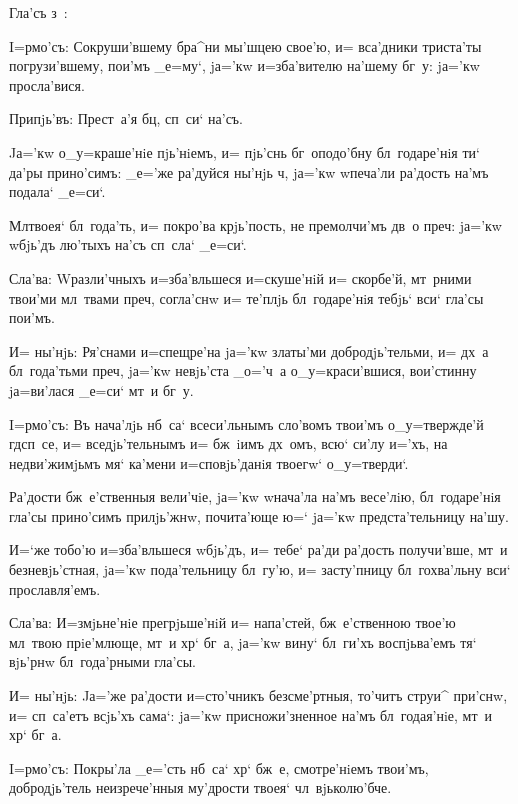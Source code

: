 Гла'съ з~:


I=рмо'съ: Сокруши'вшему бра^ни мы'шцею свое'ю, и= 
вса'дники триста'ты погрузи'вшему, пои'мъ _е=му`, jа='кw 
и=зба'вителю на'шему бг~у: jа='кw просла'вися.

Припjь'въ: Прест~а'я бц, сп~си` на'съ.

Jа='кw о_у=краше'нiе пjь'нiемъ, и= пjь'снь 
бг~оподо'бну бл~годаре'нiя ти` да'ры прино'симъ: _е='же 
ра'дуйся ны'нjь ч, jа='кw w\т печа'ли ра'дость на'мъ 
подала` _е=си`.

Мл твоея` бл~года'ть, и= покро'ва крjь'пость, не 
премолчи'мъ дв~о преч: jа='кw w\т бjь'дъ лю'тыхъ 
на'съ сп~сла` _е=си`.

Сла'ва: W\т разли'чныхъ и=зба'вльшеся и=скуше'нiй и= 
скорбе'й, мт~рними твои'ми мл~твами преч, согла'снw 
и= те'плjь бл~годаре'нiя тебjь` вси` гла'сы пои'мъ.

И= ны'нjь: Ря'снами и=спещре'на jа='кw златы'ми 
добродjь'тельми, и= дх~а бл~года'тьми преч, jа='кw 
невjь'ста _о='ч~а о_у=краси'вшися, вои'стинну jа=ви'лася 
_е=си` мт~и бг~у.


I=рмо'съ: Въ нача'лjь нб~са` всеси'льнымъ сло'вомъ 
твои'мъ о_у=твержде'й гд сп~се, и= вседjь'тельнымъ и= 
бж~iимъ дх~омъ, всю` си'лу и='хъ, на недви'жимjьмъ мя` 
ка'мени и=сповjь'данiя твоегw` о_у=тверди`.

Ра'дости бж~е'ственныя вели'чiе, jа='кw w\т нача'ла 
на'мъ весе'лiю, бл~годаре'нiя гла'сы прино'симъ 
прилjь'жнw, почита'юще ю=` jа='кw предста'тельницу на'шу.

И=`же тобо'ю и=зба'вльшеся w\т бjь'дъ, и= тебе` ра'ди 
ра'дость получи'вше, мт~и безневjь'стная, jа='кw 
пода'тельницу бл~гу'ю, и= засту'пницу бл~гохва'льну вси` 
прославля'емъ.

Сла'ва: И=змjьне'нiе прегрjьше'нiй и= напа'стей, 
бж~е'ственною твое'ю мл~твою прiе'млюще, мт~и хр` 
бг~а, jа='кw вину` бл~ги'хъ воспjьва'емъ тя` вjь'рнw 
бл~года'рными гла'сы.

И= ны'нjь: Jа='же ра'дости и=сто'чникъ безсме'ртныя, 
то'читъ струи^ при'снw, и= сп~са'етъ всjь'хъ сама`: 
jа='кw присножи'зненное на'мъ бл~годая'нiе, мт~и хр` 
бг~а.


I=рмо'съ: Покры'ла _е='сть нб~са` хр` бж~е, 
смотре'нiемъ твои'мъ, добродjь'тель неизрече'нныя 
му'дрости твоея` чл~вjьколю'бче.

